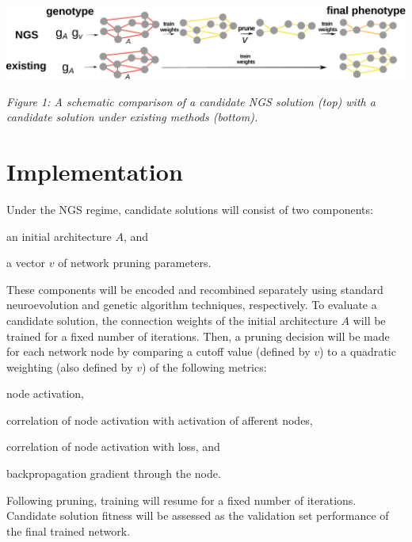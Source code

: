 \noindent
\begin{minipage}{0.8\textwidth}
 \includegraphics[width=\textwidth]{img/complete}
\end{minipage}%
\begin{minipage}{0.2\textwidth}
  {
  \begin{footnotesize}
    \textit{
   Figure 1: A schematic comparison of a candidate NGS solution (top) with a candidate solution under existing methods (bottom).
   }
  \end{footnotesize}
  \par}
\end{minipage}

\section{Implementation}

Under the NGS regime, candidate solutions will consist of two components:
\begin{enumerate*}[label=(\arabic*)]
\item an initial architecture $A$, and
\item a vector $v$ of network pruning parameters.
\end{enumerate*}
These components will be encoded and recombined separately using standard neuroevolution and genetic algorithm techniques, respectively.
To evaluate a candidate solution, the connection weights of the initial architecture $A$ will be trained for a fixed number of iterations.
Then, a pruning decision will be made for each network node by comparing a cutoff value (defined by $v$) to a quadratic weighting (also defined by $v$) of the following metrics:
\begin{enumerate*}[label=(\alph*)]
\item node activation,
\item correlation of node activation with activation of afferent nodes,
\item correlation of node activation with loss, and
\item backpropagation gradient through the node.
\end{enumerate*}
Following pruning, training will resume for a fixed number of iterations. Candidate solution fitness will be assessed as the validation set performance of the final trained network.

